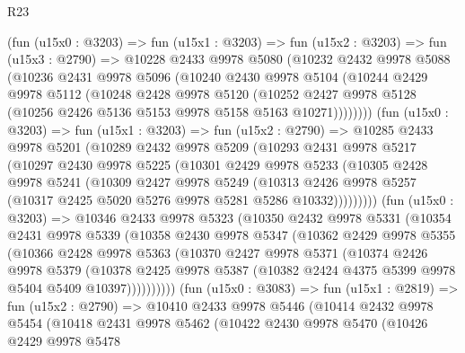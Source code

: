 \begin{lexlean}{R23}
\begin{coremodule}
    (fun (u15x0 : @3203) =>
    fun (u15x1 : @3203) =>
    fun (u15x2 : @3203) =>
    fun (u15x3 : @2790) =>
    @10228
      @2433
      @9978
      @5080
      (@10232
        @2432
        @9978
        @5088
        (@10236
          @2431
          @9978
          @5096
          (@10240
            @2430
            @9978
            @5104
            (@10244
              @2429
              @9978
              @5112
              (@10248
                @2428
                @9978
                @5120
                (@10252 @2427 @9978 @5128 (@10256 @2426 @5136 @5153 @9978 @5158 @5163 @10271))))))))
    (fun (u15x0 : @3203) =>
    fun (u15x1 : @3203) =>
    fun (u15x2 : @2790) =>
    @10285
      @2433
      @9978
      @5201
      (@10289
        @2432
        @9978
        @5209
        (@10293
          @2431
          @9978
          @5217
          (@10297
            @2430
            @9978
            @5225
            (@10301
              @2429
              @9978
              @5233
              (@10305
                @2428
                @9978
                @5241
                (@10309
                  @2427
                  @9978
                  @5249
                  (@10313
                    @2426
                    @9978
                    @5257
                    (@10317 @2425 @5020 @5276 @9978 @5281 @5286 @10332)))))))))
    (fun (u15x0 : @3203) =>
    @10346
      @2433
      @9978
      @5323
      (@10350
        @2432
        @9978
        @5331
        (@10354
          @2431
          @9978
          @5339
          (@10358
            @2430
            @9978
            @5347
            (@10362
              @2429
              @9978
              @5355
              (@10366
                @2428
                @9978
                @5363
                (@10370
                  @2427
                  @9978
                  @5371
                  (@10374
                    @2426
                    @9978
                    @5379
                    (@10378
                      @2425
                      @9978
                      @5387
                      (@10382 @2424 @4375 @5399 @9978 @5404 @5409 @10397))))))))))
    (fun (u15x0 : @3083) =>
    fun (u15x1 : @2819) =>
    fun (u15x2 : @2790) =>
    @10410
      @2433
      @9978
      @5446
      (@10414
        @2432
        @9978
        @5454
        (@10418
          @2431
          @9978
          @5462
          (@10422
            @2430
            @9978
            @5470
            (@10426
              @2429
              @9978
              @5478

\end{coremodule}
\end{lexlean}
